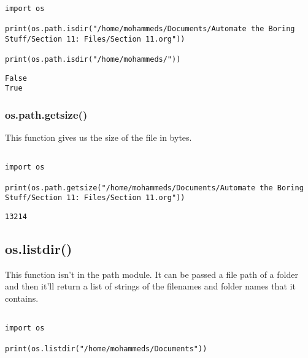 \documentclass[11pt]{article}
\begin{document}
\begin{verbatim}

import os

print(os.path.isdir("/home/mohammeds/Documents/Automate the Boring Stuff/Section 11: Files/Section 11.org"))

print(os.path.isdir("/home/mohammeds/"))

\end{verbatim}

\begin{verbatim}
False
True
\end{verbatim}

\subsubsection{os.path.getsize()}
\label{sec:orgd1dbc9b}

This function gives us the size of the file in bytes.

\begin{verbatim}

import os

print(os.path.getsize("/home/mohammeds/Documents/Automate the Boring Stuff/Section 11: Files/Section 11.org"))

\end{verbatim}

\begin{verbatim}
13214
\end{verbatim}

\subsection{os.listdir()}
\label{sec:org6ecfcaa}

This function isn't in the path module. It can be passed a file path of a folder and then it'll return a list of strings of the filenames and folder names that it contains.

\begin{verbatim}

import os

print(os.listdir("/home/mohammeds/Documents"))

\end{verbatim}
\end{document}
